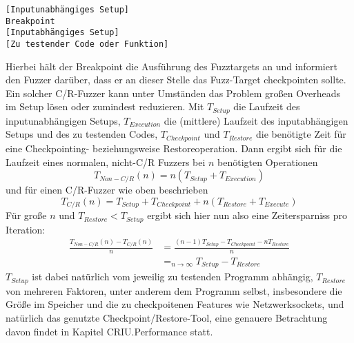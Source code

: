 \documentclass[a4paper]{article}
\begin{document}
\begin{lstlisting}[caption=Struktur C/R-Fuzzer-Fuzztarget]
[Inputunabhängiges Setup]
Breakpoint
[Inputabhängiges Setup]
[Zu testender Code oder Funktion]
\end{lstlisting}
Hierbei hält der Breakpoint die Ausführung des Fuzztargets an und informiert den Fuzzer darüber, dass er an dieser Stelle das Fuzz-Target checkpointen sollte.\\
Ein solcher C/R-Fuzzer kann unter Umständen das Problem großen Overheads im Setup lösen oder zumindest reduzieren. 
Mit $T_{Setup}$ die Laufzeit des inputunabhängigen Setups, $T_{Execution}$ die (mittlere) Laufzeit des inputabhängigen Setups und des zu testenden Codes, $T_{Checkpoint}$ und $T_{Restore}$ die benötigte Zeit für eine Checkpointing- beziehungsweise Restoreoperation. 
Dann ergibt sich für die Laufzeit eines normalen, nicht-C/R Fuzzers bei $n$ benötigten Operationen 
\begin{equation}
    T_{Non-C/R}(n) = n (T_{Setup} + T_{Execution})
\end{equation}
und für einen C/R-Fuzzer wie oben beschrieben
\begin{equation}
    T_{C/R}(n) = T_{Setup} + T_{Checkpoint} + n (T_{Restore} + T_{Execute})
\end{equation}
Für große $n$ und $T_{Restore} < T_{Setup}$ ergibt sich hier nun also eine Zeitersparniss pro Iteration:
\begin{equation}
    \begin{split}
        \frac{T_{Non-C/R}(n) - T_{C/R}(n)}{n} &= \frac{(n-1) T_{Setup} - T_{Checkpoint} - n T_{Restore}}{n} \\
        &=_{n \to \infty} T_{Setup} - T_{Restore}
    \end{split}
\end{equation}
$T_{Setup}$ ist dabei natürlich vom jeweilig zu testenden Programm abhängig, $T_{Restore}$ von mehreren Faktoren, unter anderem dem Programm selbst, insbesondere die Größe im Speicher und die zu checkpoitenen Features wie Netzwerksockets, und natürlich das genutzte Checkpoint/Restore-Tool, eine genauere Betrachtung davon findet in Kapitel CRIU.Performance statt.
\end{document}
